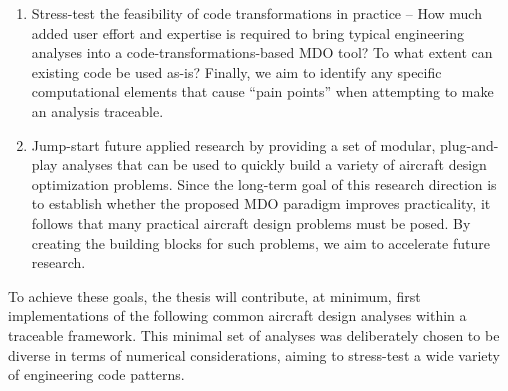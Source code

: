 \documentclass[12pt,vi,oneside]{report}
\begin{document}
    \begin{enumerate}
        \item Stress-test the feasibility of code transformations in practice -- How much added user effort and expertise is required to bring typical engineering analyses into a code-transformations-based MDO tool? To what extent can existing code be used as-is? Finally, we aim to identify any specific computational elements that cause ``pain points'' when attempting to make an analysis traceable.
        \item Jump-start future applied research by providing a set of modular, plug-and-play analyses that can be used to quickly build a variety of aircraft design optimization problems. Since the long-term goal of this research direction is to establish whether the proposed MDO paradigm improves practicality, it follows that many practical aircraft design problems must be posed. By creating the building blocks for such problems, we aim to accelerate future research.
    \end{enumerate}

    To achieve these goals, the thesis will contribute, at minimum, first implementations of the following common aircraft design analyses within a traceable framework. This minimal set of analyses was deliberately chosen to be diverse in terms of numerical considerations, aiming to stress-test a wide variety of engineering code patterns.
\end{document}
